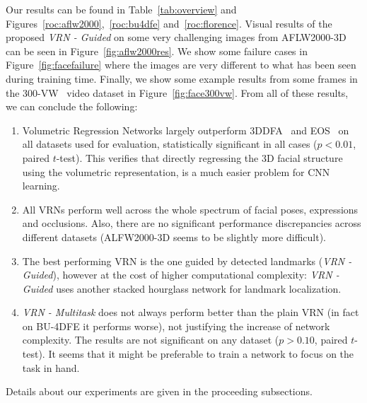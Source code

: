 Our results can be found in Table~\ref{tab:overview} and
Figures~\ref{roc:aflw2000},~\ref{roc:bu4dfe} and~\ref{roc:florence}.
Visual results of the proposed \textit{VRN - Guided} on some very
challenging images from AFLW2000-3D can be seen in
Figure~\ref{fig:aflw2000res}. We show some failure cases in
Figure~\ref{fig:facefailure} where the images are very different to
what has been seen during training time. Finally, we show some example
results from some frames in the 300-VW~\cite{sagonas2013300} video
dataset in Figure~\ref{fig:face300vw}. From all of these results, we
can conclude the following:
\begin{enumerate}
\item Volumetric Regression Networks largely outperform
  3DDFA~\cite{zhu2016face} and EOS~\cite{huber2016multiresolution} on
  all datasets used for evaluation, statistically significant in all
  cases ($p < 0.01$, paired $t$-test). This verifies that directly
  regressing the 3D facial structure using the volumetric
  representation, is a much easier problem for CNN learning.
\item All VRNs perform well across the whole spectrum of facial poses,
  expressions and occlusions. Also, there are no significant performance
  discrepancies across different datasets (ALFW2000-3D seems to be
  slightly more difficult).
\item The best performing VRN is the one guided by detected landmarks
  (\textit{VRN - Guided}), however at the cost of higher computational
  complexity: \textit{VRN - Guided} uses another stacked hourglass
  network for landmark localization.
\item \textit{VRN - Multitask} does not always perform better than the
  plain VRN (in fact on BU-4DFE it performs worse), not justifying the
  increase of network complexity. The results are not significant on
  any dataset ($p > 0.10$, paired $t$-test).  It seems that it might
  be preferable to train a network to focus on the task in hand.
\end{enumerate}

\noindent Details about our experiments are given in the proceeding subsections.

